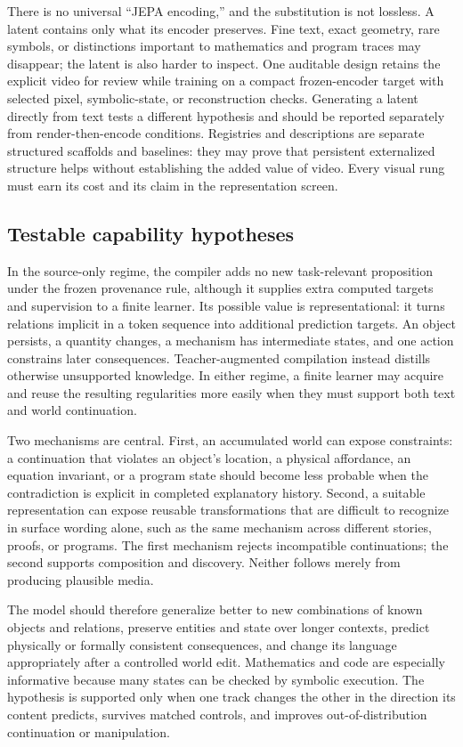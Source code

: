 \documentclass[11pt]{article}
\begin{document}
There is no universal ``JEPA encoding,'' and the substitution is not lossless. A latent contains only what its encoder preserves. Fine text, exact geometry, rare symbols, or distinctions important to mathematics and program traces may disappear; the latent is also harder to inspect. One auditable design retains the explicit video for review while training on a compact frozen-encoder target with selected pixel, symbolic-state, or reconstruction checks. Generating a latent directly from text tests a different hypothesis and should be reported separately from render-then-encode conditions. Registries and descriptions are separate structured scaffolds and baselines: they may prove that persistent externalized structure helps without establishing the added value of video. Every visual rung must earn its cost and its claim in the representation screen.

\subsection{Testable capability hypotheses}

In the source-only regime, the compiler adds no new task-relevant proposition under the frozen provenance rule, although it supplies extra computed targets and supervision to a finite learner. Its possible value is representational: it turns relations implicit in a token sequence into additional prediction targets. An object persists, a quantity changes, a mechanism has intermediate states, and one action constrains later consequences. Teacher-augmented compilation instead distills otherwise unsupported knowledge. In either regime, a finite learner may acquire and reuse the resulting regularities more easily when they must support both text and world continuation.

Two mechanisms are central. First, an accumulated world can expose constraints: a continuation that violates an object's location, a physical affordance, an equation invariant, or a program state should become less probable when the contradiction is explicit in completed explanatory history. Second, a suitable representation can expose reusable transformations that are difficult to recognize in surface wording alone, such as the same mechanism across different stories, proofs, or programs. The first mechanism rejects incompatible continuations; the second supports composition and discovery. Neither follows merely from producing plausible media.

The model should therefore generalize better to new combinations of known objects and relations, preserve entities and state over longer contexts, predict physically or formally consistent consequences, and change its language appropriately after a controlled world edit. Mathematics and code are especially informative because many states can be checked by symbolic execution. The hypothesis is supported only when one track changes the other in the direction its content predicts, survives matched controls, and improves out-of-distribution continuation or manipulation.
\end{document}
